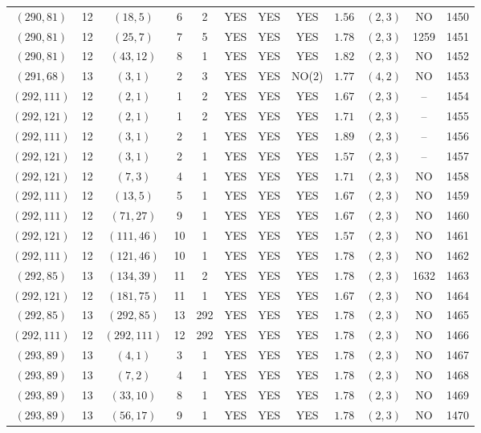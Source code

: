 \begin{longtable}{|c|c|c|c|c|c|c|c|c|c|c|c|}
$(290,81)$ & 12 & $(18,5)$ & 6 & 2 & YES & YES & YES & $1.56$ & $(2,3)$ & NO & 1450\\
$(290,81)$ & 12 & $(25,7)$ & 7 & 5 & YES & YES & YES & $1.78$ & $(2,3)$ & 1259 & 1451\\
$(290,81)$ & 12 & $(43,12)$ & 8 & 1 & YES & YES & YES & $1.82$ & $(2,3)$ & NO & 1452\\
$(291,68)$ & 13 & $(3,1)$ & 2 & 3 & YES & YES & NO(2) & $1.77$ & $(4,2)$ & NO & 1453\\
$(292,111)$ & 12 & $(2,1)$ & 1 & 2 & YES & YES & YES & $1.67$ & $(2,3)$ & -- & 1454\\
$(292,121)$ & 12 & $(2,1)$ & 1 & 2 & YES & YES & YES & $1.71$ & $(2,3)$ & -- & 1455\\
$(292,111)$ & 12 & $(3,1)$ & 2 & 1 & YES & YES & YES & $1.89$ & $(2,3)$ & -- & 1456\\
$(292,121)$ & 12 & $(3,1)$ & 2 & 1 & YES & YES & YES & $1.57$ & $(2,3)$ & -- & 1457\\
$(292,121)$ & 12 & $(7,3)$ & 4 & 1 & YES & YES & YES & $1.71$ & $(2,3)$ & NO & 1458\\
$(292,111)$ & 12 & $(13,5)$ & 5 & 1 & YES & YES & YES & $1.67$ & $(2,3)$ & NO & 1459\\
$(292,111)$ & 12 & $(71,27)$ & 9 & 1 & YES & YES & YES & $1.67$ & $(2,3)$ & NO & 1460\\
$(292,121)$ & 12 & $(111,46)$ & 10 & 1 & YES & YES & YES & $1.57$ & $(2,3)$ & NO & 1461\\
$(292,111)$ & 12 & $(121,46)$ & 10 & 1 & YES & YES & YES & $1.78$ & $(2,3)$ & NO & 1462\\
$(292,85)$ & 13 & $(134,39)$ & 11 & 2 & YES & YES & YES & $1.78$ & $(2,3)$ & 1632 & 1463\\
$(292,121)$ & 12 & $(181,75)$ & 11 & 1 & YES & YES & YES & $1.67$ & $(2,3)$ & NO & 1464\\
$(292,85)$ & 13 & $(292,85)$ & 13 & 292 & YES & YES & YES & $1.78$ & $(2,3)$ & NO & 1465\\
$(292,111)$ & 12 & $(292,111)$ & 12 & 292 & YES & YES & YES & $1.78$ & $(2,3)$ & NO & 1466\\
$(293,89)$ & 13 & $(4,1)$ & 3 & 1 & YES & YES & YES & $1.78$ & $(2,3)$ & NO & 1467\\
$(293,89)$ & 13 & $(7,2)$ & 4 & 1 & YES & YES & YES & $1.78$ & $(2,3)$ & NO & 1468\\
$(293,89)$ & 13 & $(33,10)$ & 8 & 1 & YES & YES & YES & $1.78$ & $(2,3)$ & NO & 1469\\
$(293,89)$ & 13 & $(56,17)$ & 9 & 1 & YES & YES & YES & $1.78$ & $(2,3)$ & NO & 1470\\

\end{longtable}
